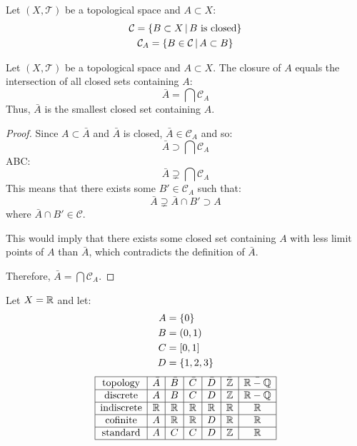 \documentclass[letterpaper,12pt,fleqn]{article}
\newcommand{\T}{\mathscr{T}}
\renewcommand{\C}{\mathcal{C}}
\begin{document}
\begin{notation}
  Let \((X,\T)\) be a topological space and \(A\subset X\):
  \begin{gather*}
    \C=\setb{B\subset X}{B\ \text{is closed}} \\
    \C_A=\setb{B\in\C}{A\subset B}
  \end{gather*}
\end{notation}

\begin{theorem}
  Let \((X,\T)\) be a topological space and \(A\subset X\).  The closure of \(A\) equals the intersection of all
  closed sets containing \(A\):
  \[\bar{A}=\bigcap\C_A\]
  Thus, \(\bar{A}\) is the smallest closed set containing \(A\).
\end{theorem}

\begin{proof}
  Since \(A\subset\bar{A}\) and \(\bar{A}\) is closed, \(\bar{A}\in\C_A\) and so:
  \[\bar{A}\supset\bigcap\C_A\]
  ABC:
  \[\bar{A}\supsetneq\bigcap\C_A\]
  This means that there exists some \(B'\in\C_A\) such that:
  \[\bar{A}\supsetneq\bar{A}\cap B'\supset A\]
  where \(\bar{A}\cap B'\in\C\).

  This would imply that there exists some closed set containing \(A\) with less limit points of \(A\) than
  \(\bar{A}\), which contradicts the definition of \(\bar{A}\).

  Therefore, \(\displaystyle\bar{A}=\bigcap\C_A\).
\end{proof}

\begin{example}
  \setlength\extrarowheight{2ex}
  Let \(X=\mathbb{R}\) and let:
  \begin{align*}
    A &= \{0\} \\
    B &= (0,1) \\
    C &= [0,1] \\
    D &= \{1,2,3\}
  \end{align*}
  \[\begin{array}{|c|c|c|c|c|c|c|}
  \hline
  \text{topology} & \bar{A} & \bar{B} & \bar{C} & \bar{D} & \bar{\mathbb{Z}} & \bar{\mathbb{R}-\mathbb{Q}} \\
  \hline
  \text{discrete} & A & B & C & D & \mathbb{Z} & \mathbb{R}-\mathbb{Q} \\
  \hline
  \text{indiscrete} & \mathbb{R} & \mathbb{R} & \mathbb{R} & \mathbb{R} & \mathbb{R} & \mathbb{R} \\
  \hline
  \text{cofinite} & A & \mathbb{R} & \mathbb{R} & D & \mathbb{R} & \mathbb{R} \\
  \hline
  \text{standard} & A & C & C & D & \mathbb{Z} & \mathbb{R} \\
  \hline
  \end{array}\]
\end{example}
\end{document}
